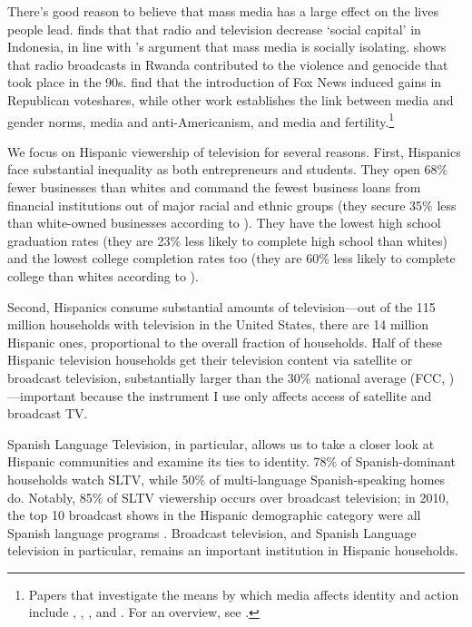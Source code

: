 \documentclass[11pt]{article}
\begin{document}
There's good reason to believe that mass media has a large effect on the lives people lead. \cite{olken_television_2009} finds that that radio and television decrease `social capital' in Indonesia, in line with \cite{putnam_bowling_2001}'s argument that mass media is socially isolating. \cite{yanagizawa-drott_propaganda_2014} shows that radio broadcasts in Rwanda contributed to the violence and genocide that took place in the 90s. \cite{dellavigna_fox_2007} find that the introduction of Fox News induced gains in Republican voteshares, while other work establishes the link between media and gender norms, media and anti-Americanism, and media and fertility.\footnote{ Papers that investigate the means by which media affects identity and action include \cite{jensen_power_2009}, \cite{gentzkow_media_2004}, \cite{ferrara_soap_2012}, and \cite{kearney_media_2015}. For an overview, see \cite{dellavigna_economic_2015}.}

We focus on Hispanic viewership of television for several reasons. First, Hispanics face substantial inequality as both entrepreneurs and students. They open 68\% fewer businesses than whites and command the fewest business loans from financial institutions out of major racial and ethnic groups (they secure 35\% less than white-owned businesses according to \cite{orozco_state_2017}). They have the lowest high school graduation rates (they are 23\% less likely to complete high school than whites) and the lowest college completion rates too (they are 60\% less likely to complete college than whites according to \cite{tienda_hispanicity_2009}).  

Second, Hispanics consume substantial amounts of television---out of the 115 million households with television in the United States, there are 14 million Hispanic ones, proportional to the overall fraction of households. Half of these Hispanic television households get their television content via satellite or broadcast television, substantially larger than the 30\% national average (FCC\cite{noauthor_hispanic_2016}, \cite{de_la_merced_att_2014})---important because the instrument I use only affects access of satellite and broadcast TV.

Spanish Language Television, in particular, allows us to take a closer look at Hispanic communities and examine its ties to identity. 78\% of Spanish-dominant households watch SLTV, while 50\% of multi-language Spanish-speaking homes do. Notably, 85\% of SLTV viewership occurs over broadcast television; in 2010, the top 10 broadcast shows in the Hispanic demographic category were all Spanish language programs \citep{pardo_three_2011}. Broadcast television, and Spanish Language television in particular, remains an important institution in Hispanic households. 
 
\end{document}
